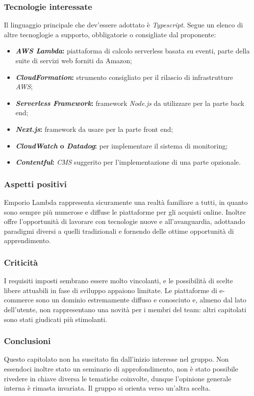 \subsubsection{Tecnologie interessate}

Il linguaggio principale che dev'essere adottato è \textit{Typescript}. Segue un elenco di altre tecnoglogie a supporto, obbligatorie o consigliate dal proponente:
\begin{itemize}
    \item \textbf{\textit{AWS Lambda}:} piattaforma di calcolo serverless basata su eventi, parte della suite di servizi web forniti da Amazon;
    \item \textbf{\textit{CloudFormation}:} strumento consigliato per il rilascio di infrastrutture \textit{AWS};
    \item \textbf{\textit{Serverless Framework}:} framework \textit{Node.js} da utilizzare per la parte back end;
    \item \textbf{\textit{Next.js}:} framework da usare per la parte front end;
    \item \textbf{\textit{CloudWatch} o \textit{Datadog}:} per implementare il sistema di monitoring;
    \item \textbf{\textit{Contentful}:} \textit{CMS} suggerito per l'implementazione di una parte opzionale.
\end{itemize}


\subsubsection{Aspetti positivi}

Emporio Lambda rappresenta sicuramente una realtà familiare a tutti, in quanto sono sempre più numerose e diffuse le piattaforme per gli acquisti online. Inoltre offre l'opportunità di lavorare con tecnologie nuove e all'avanguardia, adottando paradigmi diversi a quelli tradizionali e fornendo delle ottime opportunità di apprendimento.


\subsubsection{Criticità}

I requisiti imposti sembrano essere molto vincolanti, e le possibilità di scelte libere attuabili in fase di sviluppo appaiono limitate. Le piattaforme di e-commerce sono un dominio estremamente diffuso e conosciuto e, almeno dal lato dell'utente, non rappresentano una novità per i membri del team: altri capitolati sono stati giudicati più stimolanti.


\subsubsection{Conclusioni}

Questo capitolato non ha suscitato fin dall'inizio interesse nel gruppo. Non essendoci inoltre stato un seminario di approfondimento, non è stato possibile rivedere in chiave diversa le tematiche coinvolte, dunque l'opinione generale interna è rimasta invariata. Il gruppo si orienta verso un'altra scelta.




